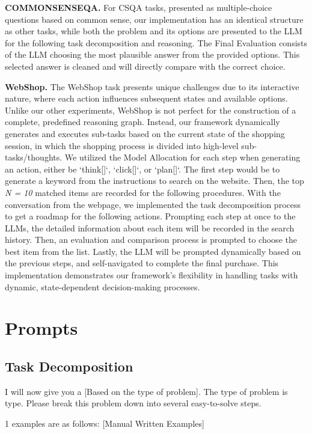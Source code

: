\textbf{COMMONSENSEQA.}
For CSQA tasks, presented as multiple-choice questions based on common sense, our implementation has an identical structure as other tasks, while both the problem and its options are presented to the LLM for the following task decomposition and reasoning. The Final Evaluation consists of the LLM choosing the most plausible answer from the provided options. This selected answer is cleaned and will directly compare with the correct choice.

\textbf{WebShop.} 
The WebShop task presents unique challenges due to its interactive nature, where each action influences subsequent states and available options. Unlike our other experiments, WebShop is not perfect for the construction of a complete, predefined reasoning graph. Instead, our framework dynamically generates and executes sub-tasks based on the current state of the shopping session, in which the shopping process is divided into high-level sub-tasks/thoughts. We utilized the Model Allocation for each step when generating an action, either be `think[]`, `click[]`, or `plan[]`. The first step would be to generate a keyword from the instructions to search on the website. Then, the top \textit{N = 10} matched items are recorded for the following procedures. With the conversation from the webpage, we implemented the task decomposition process to get a roadmap for the following actions. Prompting each step at once to the LLMs, the detailed information about each item will be recorded in the search history. Then, an evaluation and comparison process is prompted to choose the best item from the list. Lastly, the LLM will be prompted dynamically based on the previous steps, and self-navigated to complete the final purchase. This implementation demonstrates our framework's flexibility in handling tasks with dynamic, state-dependent decision-making processes.

\vspace{-3mm}
\section{Prompts}
\subsection{Task Decomposition}
I will now give you a [Based on the type of problem]. The type of problem is {type}. Please break this problem down into several easy-to-solve steps.

1 examples are as follows:
[Manual Written Examples]

